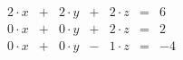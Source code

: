 \documentclass[11pt]{article}
\begin{document}
\[
\begin{array}{lclcrcrr}
2 \cdot x & + & 2 \cdot y & + &  2 \cdot z & = & 6 \\
0 \cdot x & + & 0 \cdot y & + &  2 \cdot z & = & 2 \\
0 \cdot x & + & 0 \cdot y & - &  1 \cdot z & = & -4
\end{array}
\]
\end{document}
